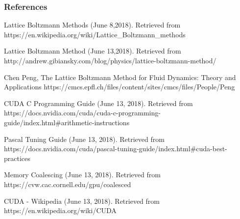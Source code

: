 \documentclass[9pt]{beamer}
\begin{document}
\begin{frame}[allowframebreaks]

\frametitle{References}
\begin{thebibliography}{10}
	
	\beamertemplateonlinebibitems
	Lattice Boltzmann Methods (June 8,2018). 
	\newblock Retrieved from https://en.wikipedia.org/wiki/Lattice\_Boltzmann\_methods
	
	
	
	\beamertemplateonlinebibitems
	Lattice Boltzmann Method (June 13,2018). 
	\newblock Retrieved from http://andrew.gibiansky.com/blog/physics/lattice-boltzmann-method/
	
	\beamertemplateonlinebibitems
	Chen Peng, The Lattice Boltzmann Method for Fluid
	Dynamics: Theory and Applications
	\newblock https://cmcs.epfl.ch/files/content/sites/cmcs/files/People/Peng%


	\beamertemplateonlinebibitems
	CUDA C Programming Guide (June 13, 2018).
    \newblock Retrieved from https://docs.nvidia.com/cuda/cuda-c-programming-guide/index.html\#arithmetic-instructions
    
    \beamertemplateonlinebibitems
    Pascal Tuning Guide (June 13, 2018).
    \newblock Retrieved from https://docs.nvidia.com/cuda/pascal-tuning-guide/index.html\#cuda-best-practices
    
    \beamertemplateonlinebibitems
    Memory Coalescing (June 13, 2018). 
    \newblock Retrieved from https://cvw.cac.cornell.edu/gpu/coalesced

	\beamertemplateonlinebibitems
    CUDA - Wikipedia (June 13, 2018). 
    \newblock Retrieved from https://en.wikipedia.org/wiki/CUDA
    
       
\end{thebibliography}

\end{frame}






\end{document}
